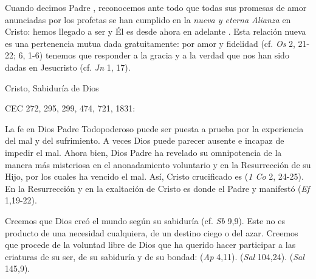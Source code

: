 	 Cuando decimos Padre , reconocemos ante todo que todas sus promesas de amor anunciadas por los profetas se han cumplido en la \emph{nueva y eterna Alianza} en Cristo: hemos llegado a ser  y Él es desde ahora en adelante . Esta relación nueva es una pertenencia mutua dada gratuitamente: por amor y fidelidad (cf. \emph{Os} 2, 21-22; 6, 1-6) tenemos que responder a la gracia y a la verdad que nos han sido dadas en Jesucristo (cf. \emph{Jn} 1, 17).
	
	Cristo, Sabiduría de Dios
	
	CEC 272, 295, 299, 474, 721, 1831:
	
	
	 La fe en Dios Padre Todopoderoso puede ser puesta a prueba por la experiencia del mal y del sufrimiento. A veces Dios puede parecer ausente e incapaz de impedir el mal. Ahora bien, Dios Padre ha revelado su omnipotencia de la manera más misteriosa en el anonadamiento voluntario y en la Resurrección de su Hijo, por los cuales ha vencido el mal. Así, Cristo crucificado es  (\emph{1 Co} 2, 24-25). En la Resurrección y en la exaltación de Cristo es donde el Padre  y manifestó  (\emph{Ef} 1,19-22).
	
	
	 Creemos que Dios creó el mundo según su sabiduría (cf. \emph{Sb} 9,9). Este no es producto de una necesidad cualquiera, de un destino ciego o del azar. Creemos que procede de la voluntad libre de Dios que ha querido hacer participar a las criaturas de su ser, de su sabiduría y de su bondad:  (\emph{Ap} 4,11).  (\emph{Sal} 104,24).  (\emph{Sal} 145,9).
	
	
